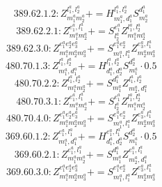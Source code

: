 \documentclass[letterpaper,10pt,fleqn,leqno,onecolumn]{article}
\begin{document}
\begin{equation} \;\;\;\;\;\;  389.62.1.2: Z^{l_{1}^{a},l_{2}^{a}}_{m_{1}^{a}m_{2}^{a}}+=H^{l_{1}^{a},l_{2}^{a}}_{m_{1}^{a},d_{1}^{a}}S^{d_{1}^{a}}_{m_{2}^{a}} \end{equation}
\begin{equation} \;\;\;\;\;\;  389.62.2.1: Z^{e_{1}^{a},l_{1}^{a}}_{m_{1}^{a}m_{2}^{a}}+=S^{e_{1}^{a}}_{l_{2}^{a}}Z^{l_{1}^{a},l_{2}^{a}}_{m_{1}^{a}m_{2}^{a}} \end{equation}
\begin{equation} \;\;\;\;\;\;  389.62.3.0: Z^{e_{1}^{a}e_{2}^{a}e_{3}^{a}}_{m_{1}^{a}m_{2}^{a}m_{3}^{a}}+=S^{e_{1}^{a}e_{2}^{a}}_{m_{1}^{a},l_{1}^{a}}Z^{e_{3}^{a},l_{1}^{a}}_{m_{2}^{a}m_{3}^{a}} \end{equation}
\begin{equation} \;\;\;\;\;\;  480.70.1.3: Z^{l_{1}^{a},l_{2}^{a}}_{m_{1}^{a},d_{1}^{a}}+=H^{l_{1}^{a},l_{2}^{a}}_{d_{1}^{a},d_{2}^{a}}S^{d_{2}^{a}}_{m_{1}^{a}}\cdot 0.5 \end{equation}
\begin{equation} \;\;\;\;\;\;  480.70.2.2: Z^{l_{1}^{a},l_{2}^{a}}_{m_{1}^{a}m_{2}^{a}}+=S^{d_{1}^{a}}_{m_{1}^{a}}Z^{l_{1}^{a},l_{2}^{a}}_{m_{2}^{a},d_{1}^{a}} \end{equation}
\begin{equation} \;\;\;\;\;\;  480.70.3.1: Z^{e_{1}^{a},l_{1}^{a}}_{m_{1}^{a}m_{2}^{a}}+=S^{e_{1}^{a}}_{l_{2}^{a}}Z^{l_{1}^{a},l_{2}^{a}}_{m_{1}^{a}m_{2}^{a}} \end{equation}
\begin{equation} \;\;\;\;\;\;  480.70.4.0: Z^{e_{1}^{a}e_{2}^{a}e_{3}^{a}}_{m_{1}^{a}m_{2}^{a}m_{3}^{a}}+=S^{e_{1}^{a}e_{2}^{a}}_{m_{1}^{a},l_{1}^{a}}Z^{e_{3}^{a},l_{1}^{a}}_{m_{2}^{a}m_{3}^{a}} \end{equation}
\begin{equation} \;\;\;\;\;\;  369.60.1.2: Z^{e_{1}^{a},l_{1}^{a}}_{m_{1}^{a},d_{1}^{a}}+=H^{e_{1}^{a},l_{1}^{a}}_{d_{1}^{a},d_{2}^{a}}S^{d_{2}^{a}}_{m_{1}^{a}}\cdot 0.5 \end{equation}
\begin{equation} \;\;\;\;\;\;  369.60.2.1: Z^{e_{1}^{a},l_{1}^{a}}_{m_{1}^{a}m_{2}^{a}}+=S^{d_{1}^{a}}_{m_{1}^{a}}Z^{e_{1}^{a},l_{1}^{a}}_{m_{2}^{a},d_{1}^{a}} \end{equation}
\begin{equation} \;\;\;\;\;\;  369.60.3.0: Z^{e_{1}^{a}e_{2}^{a}e_{3}^{a}}_{m_{1}^{a}m_{2}^{a}m_{3}^{a}}+=S^{e_{1}^{a}e_{2}^{a}}_{m_{1}^{a},l_{1}^{a}}Z^{e_{3}^{a},l_{1}^{a}}_{m_{2}^{a}m_{3}^{a}} \end{equation}
\end{document}
